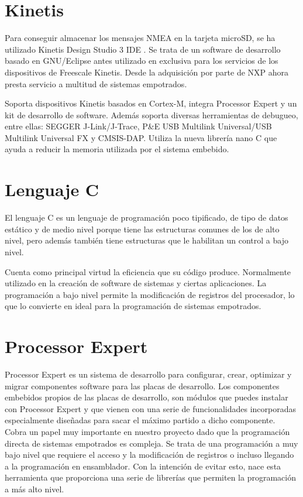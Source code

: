 
\section{Kinetis}
Para conseguir almacenar los mensajes NMEA en la tarjeta microSD, se ha utilizado Kinetis Design Studio 3 IDE \cite{kinetis}. Se trata de un software de desarrollo basado en GNU/Eclipse antes utilizado en exclusiva para los servicios de los dispositivos de Freescale Kinetis. Desde la adquisición por parte de NXP ahora presta servicio a multitud de sistemas empotrados.

Soporta dispositivos Kinetis basados en Cortex-M, integra Processor Expert y un kit de desarrollo de software. 
Además soporta diversas herramientas de debugueo, entre ellas: SEGGER J-Link/J-Trace, P\&E USB Multilink Universal/USB Multilink Universal FX y CMSIS-DAP. Utiliza la nueva librería nano C que ayuda a reducir la memoria utilizada por el sistema embebido.

\section{Lenguaje C}
El lenguaje C \cite{C} es un lenguaje de programación poco tipificado, de tipo de datos estático y de medio nivel porque tiene las estructuras comunes de los de alto nivel, pero además también tiene estructuras que le habilitan un control a bajo nivel.

Cuenta como principal virtud la eficiencia que su código produce. Normalmente utilizado en la creación de software de sistemas y ciertas aplicaciones. La programación a bajo nivel permite la modificación de registros del procesador, lo que lo convierte en ideal para la programación de sistemas empotrados.

\section{Processor Expert}
Processor Expert \cite{ProcessorExpert} es un sistema de desarrollo para configurar, crear, optimizar y migrar componentes software para las placas de desarrollo. 
Los componentes embebidos propios de las placas de desarrollo, son módulos que puedes instalar con Processor Expert  y que vienen con una serie de funcionalidades incorporadas especialmente diseñadas para sacar el máximo partido a dicho componente. Cobra un papel muy importante en nuestro proyecto dado que la programación directa de sistemas empotrados es compleja. Se trata de una programación a muy bajo nivel que requiere el acceso y la modificación de registros o incluso llegando a la programación en ensamblador. Con la intención de evitar esto, nace esta herramienta que proporciona una serie de librerías que permiten la programación a más alto nivel.

